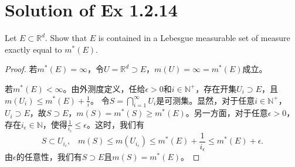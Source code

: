 \documentclass[reqno,a4paper,14pt]{amsart}
\begin{document}
\section{Solution of Ex 1.2.14}
Let $E\subset \mathbb{R}^d$. Show that $E$ is contained in a Lebesgue measurable set of measure exactly equal to $m^*(E)$.
\begin{proof}
    若$m^*(E)=\infty$，令$U=\mathbb{R}^d\supset E$，$m(U)=\infty=m^*(E)$成立。
    
    若$m^*(E)<\infty$。由外测度定义，任给$\epsilon>0$和$i\in\mathbb{N}^+$，存在开集$U_i\supset E$，且$m(U_i)\leq m^*(E)+\frac{1}{i}$。
    令$S=\bigcap_{i=1}^\infty U_i$是可测集。显然，对于任意$i\in\mathbb{N}^+$，$U_i\supset E$，故$S\supset E$，$m(S)=m^*(S)\geq m^*(E)$。另一方面，对于任意$\epsilon>0$，存在$i_\epsilon\in \mathbb{N}$，使得$\frac{1}{i_\epsilon}\leq \epsilon$。这时，我们有
    \begin{equation*}
        S\subset U_{i_\epsilon},\;\;\; m(S)\leq m(U_{i_\epsilon})\leq m^*(E)+\frac{1}{i_\epsilon}\leq m^*(E)+\epsilon.
    \end{equation*}
    由$\epsilon$的任意性，我们有$S\supset E$且$m(S)=m^*(E)$。
\end{proof}
\end{document}

